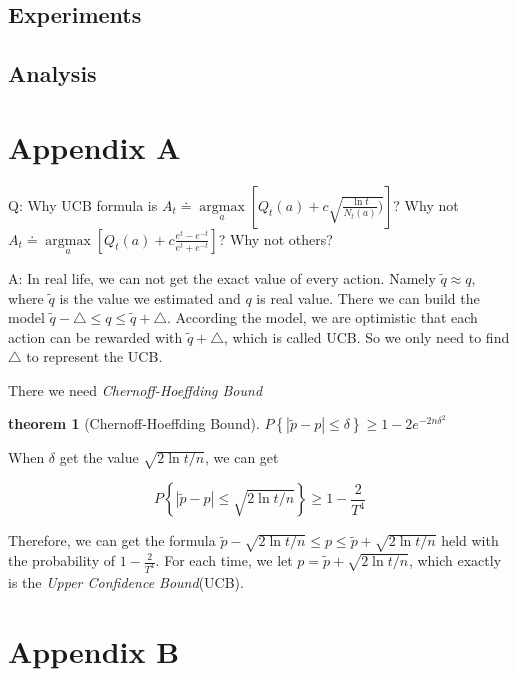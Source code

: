 \documentclass[12pt]{article}
\newtheorem{theorem}{theorem}
\begin{document}
\subsection{Experiments}

\subsection{Analysis}




\clearpage


\section*{Appendix A}\label{Appendix A}
Q: Why UCB formula is $A_t \doteq \mathop{argmax}\limits_{a}\left [Q_t(a)+c\sqrt{\frac{\ln{t}}{N_t(a)})}  \right ] $? Why not $A_t \doteq \mathop{argmax}\limits_{a}\left [Q_t(a)+c\frac{e^t-e^{-t}}{e^t+e^{-t}}  \right ] $? Why not others?

A: In real life, we can not get the exact value of every action. Namely $\tilde{q} \approx q$, where $\tilde{q}$ is the value we estimated and $q$ is real value. There we can build the model $\tilde{q} - \triangle \le q \le \tilde{q} + \triangle$\cite{FengWei}. According the model, we are optimistic that each action can be rewarded with $\tilde{q} + \triangle$, which is called UCB. So we only need to find $\triangle$ to represent the UCB.

There we need \textit{Chernoff-Hoeffding Bound}
\begin{theorem}[Chernoff-Hoeffding Bound] $P\left \{\left |\tilde{p}-p  \right |\le \delta   \right \} \ge 1-2e^{-2n\delta^2}$
\end{theorem}
When $\delta$ get the value $\sqrt{2\ln t/n}$, we can get

\begin{equation}
	P\left \{\left |\tilde{p}-p  \right |\le \sqrt{2\ln t/n}   \right \} \ge 1-\frac{2}{T^4}
\end{equation}

Therefore, we can get the formula $\tilde{p} - \sqrt{2\ln t/n} \le p \le \tilde{p} + \sqrt{2\ln t/n}$ held with the probability of $1-\frac{2}{T^4}$. For each time, we let $p = \tilde{p} + \sqrt{2\ln t/n}$, which exactly is the \textit{Upper Confidence Bound}(UCB).


\section*{Appendix B}\label{Appendix B}
\end{document}
